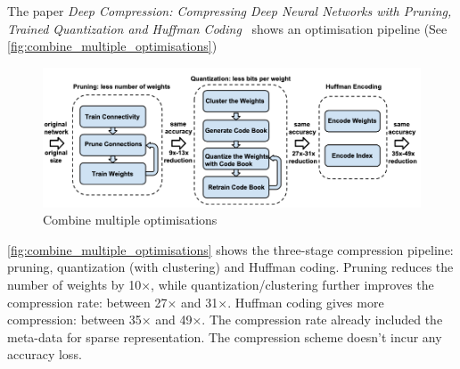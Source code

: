The paper \textit{Deep Compression: Compressing Deep Neural Networks with
Pruning, Trained Quantization and Huffman Coding}~\cite{han2015deep} shows an
optimisation pipeline (See \autoref{fig:combine_multiple_optimisations})

\begin{figure}[ht]
    \includegraphics[width=\textwidth]{images/introduction/combine_multiple_optimisations.png}
    \centering
    \caption{Combine multiple optimisations}\label{fig:combine_multiple_optimisations}
\end{figure}

\autoref{fig:combine_multiple_optimisations} shows the three-stage compression
pipeline: pruning, quantization (with clustering) and Huffman coding. Pruning
reduces the number of weights by 10×, while quantization/clustering further
improves the compression rate: between 27× and 31×. Huffman coding gives more
compression: between 35× and 49×. The compression rate already included the
meta-data for sparse representation. The compression scheme doesn't incur any
accuracy loss.
